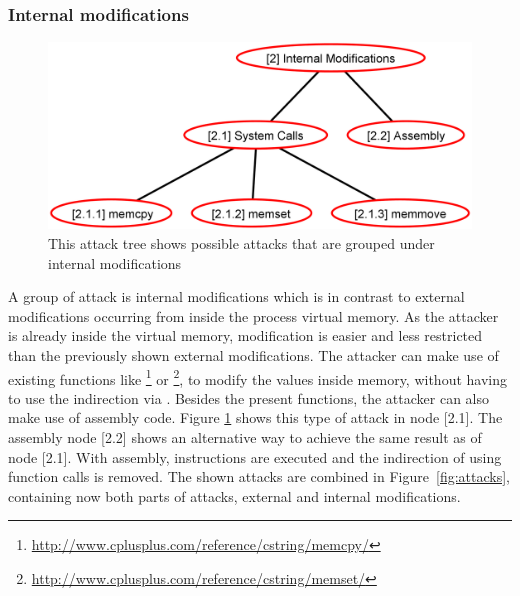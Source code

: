 \subsubsection{Internal modifications}
\label{sec:internal_modifications}
\begin{figure}[h]
\centering
\includegraphics[width=.75\textwidth, keepaspectratio]{sections/adtrees/InternalModificationsWithoutDefenses.png}
\caption{This attack tree shows possible attacks that are grouped under internal modifications}
\label{fig:attacks_internal}
\end{figure}
A group of attack is internal modifications which is in contrast to external modifications occurring from inside the process virtual memory. As the attacker is already inside the virtual memory, modification is easier and less restricted than the previously shown external modifications. The attacker can make use of existing functions like \footnote{\url{http://www.cplusplus.com/reference/cstring/memcpy/}} or \footnote{\url{http://www.cplusplus.com/reference/cstring/memset/}}, to modify the values inside memory, without having to use the indirection via . Besides the present  functions, the attacker can also make use of assembly code. Figure \ref{fig:attacks_internal} shows this type of attack in node [2.1]. The assembly node [2.2] shows an alternative way to achieve the same result as of node [2.1]. With assembly, instructions are executed and the indirection of using function calls is removed. The shown attacks are combined in Figure~\ref{fig:attacks}, containing now both parts of attacks, external and internal modifications.